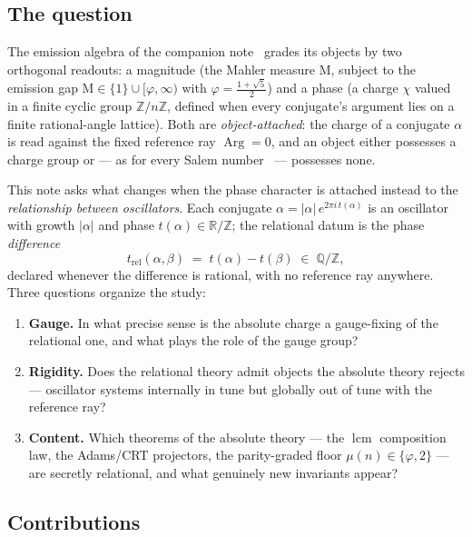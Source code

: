 \documentclass[11pt]{article}
\theoremstyle{plain}
\theoremstyle{definition}
\theoremstyle{remark}
\newcommand{\Q}{\mathbb{Q}}
\newcommand{\Z}{\mathbb{Z}}
\newcommand{\R}{\mathbb{R}}
\newcommand{\Mah}{\mathrm{M}}
\DeclareMathOperator{\Arg}{Arg}
\DeclareMathOperator{\lcm}{lcm}
\newcommand{\tors}{\Q/\Z}
\begin{document}
\subsection{The question}

The emission algebra of the companion note~\cite{CMC} grades its objects by two
orthogonal readouts: a magnitude (the Mahler measure $\Mah$, subject to the
emission gap $\Mah\in\{1\}\cup[\varphi,\infty)$ with $\varphi=\frac{1+\sqrt5}{2}$)
and a phase (a charge $\chi$ valued in a finite cyclic group $\Z/n\Z$, defined when
every conjugate's argument lies on a finite rational-angle lattice). Both are
\emph{object-attached}: the charge of a conjugate $\alpha$ is read against the
fixed reference ray $\Arg=0$, and an object either possesses a charge group or ---
as for every Salem number~\cite{Salem,Bertin} --- possesses none.

This note asks what changes when the phase character is attached instead to the
\emph{relationship between oscillators}. Each conjugate $\alpha=|\alpha|\,
e^{2\pi i\,t(\alpha)}$ is an oscillator with growth $|\alpha|$ and phase
$t(\alpha)\in\R/\Z$; the relational datum is the phase \emph{difference}
\[
t_{\mathrm{rel}}(\alpha,\beta)\;=\;t(\alpha)-t(\beta)\;\in\;\tors ,
\]
declared whenever the difference is rational, with no reference ray anywhere. Three
questions organize the study:
\begin{enumerate}
\item[(i)] \textbf{Gauge.} In what precise sense is the absolute charge a
  gauge-fixing of the relational one, and what plays the role of the gauge group?
\item[(ii)] \textbf{Rigidity.} Does the relational theory admit objects the
  absolute theory rejects --- oscillator systems internally in tune but globally
  out of tune with the reference ray?
\item[(iii)] \textbf{Content.} Which theorems of the absolute theory --- the
  $\lcm$ composition law, the Adams/CRT projectors, the parity-graded floor
  $\mu(n)\in\{\varphi,2\}$ --- are secretly relational, and what genuinely new
  invariants appear?
\end{enumerate}

\subsection{Contributions}
\end{document}
